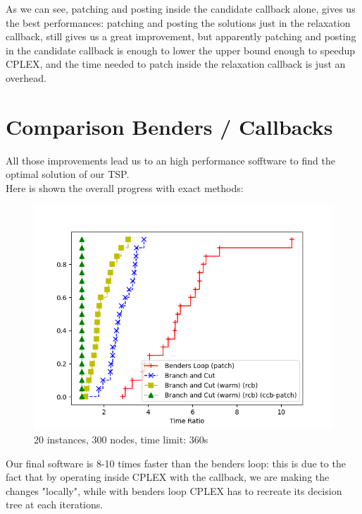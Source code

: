 As we can see, patching and posting inside the candidate callback alone, gives us the best performances: patching and posting the solutions just in the relaxation callback, still gives us a great improvement, but apparently patching and posting in the candidate callback is enough to lower the upper bound enough to speedup CPLEX, and the time needed to patch inside the relaxation callback is just an overhead.

\newpage

\section{Comparison Benders / Callbacks}
All those improvements lead us to an high performance sofftware to find the optimal solution of our TSP.\\
Here is shown the overall progress with exact methods:
\FloatBarrier
\begin{figure}[h]
    \centering
    \includegraphics*[width=.6\textwidth]{../plots/perfprof_exact_times_result.png}
    \caption*{20 instances, 300 nodes, time limit: 360s}
\end{figure}
\FloatBarrier

Our final software is 8-10 times faster than the benders loop: this is due to the fact that by operating inside CPLEX with the callback, we are making the changes "locally", while with benders loop CPLEX has to recreate its decision tree at each iterations.